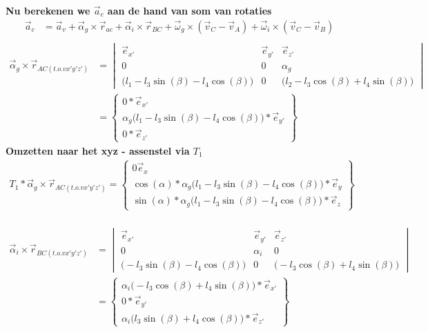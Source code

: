 \documentclass[a4paper,10pt]{article}
\begin{document}
\textbf{Nu berekenen we $\vec{a}_c$ aan de hand van som van rotaties} 
\begin{equation}
	\begin{aligned}
		\vec{a}_c &= \vec{a}_v + \vec{\alpha}_g  \times \vec{r}_{ac} + \vec{\alpha}_i \times \vec{r}_{BC} + \vec{\omega}_g \times ( \vec{v}_{C} - \vec{v}_{A}) + \vec{\omega}_i \times ( \vec{v}_{C} - \vec{v}_{B})\\
	\end{aligned}
\end{equation}
\begin{equation}
	\begin{aligned}
		\vec{\alpha}_g \times \vec{r}_{AC(t.o.v x'y'z')}  &=  \begin{vmatrix}
			\vec{e}_{x'}& \vec{e}_{y'} & \vec{e}_{z'}\\
			0 & 0 & \alpha_g \\		
			\Big(l_1 - l_3 \sin(\beta) - l_4 \cos(\beta)\Big) &
			0 & \Big (l_2 - l_3 \cos(\beta) + l_4 \sin(\beta) \Big) 
		\end{vmatrix}\\
		&= \begin{Bmatrix}
			0*\vec{e}_{x'}\\
			\alpha_g \Big(l_1 - l_3 \sin(\beta) - l_4 \cos(\beta)\Big)*\vec{e}_{y'}\\
			0*\vec{e}_{z'}
		\end{Bmatrix}
	\end{aligned}
\end{equation}
\textbf{Omzetten naar het xyz - assenstel via $T_1$}
\begin{equation}
	\begin{aligned}
		{T}_{1}*\vec{\alpha}_g \times \vec{r}_{AC(t.o.v x'y'z')} = \begin{Bmatrix}
			{0\vec{e}_{x}}\\
			\cos(\alpha)*	\alpha_g \Big(l_1 - l_3 \sin(\beta) - l_4 \cos(\beta)\Big)*\vec{e}_{y}\\
			\sin(\alpha)*	\alpha_g \Big(l_1 - l_3 \sin(\beta) - l_4 \cos(\beta)\Big)*\vec{e}_{z}
		\end{Bmatrix}
	\end{aligned}
\end{equation}\\
\begin{equation}
	\begin{aligned}
		\vec{\alpha}_i \times \vec{r}_{BC(t.o.v x'y'z')}  &=  \begin{vmatrix}
			\vec{e}_{x'}& \vec{e}_{y'} & \vec{e}_{z'}\\
			0 & \alpha_i & 0 \\		
			\Big(- l_3 \sin(\beta) - l_4 \cos(\beta)\Big) &
			0 & \Big (- l_3 \cos(\beta) + l_4 \sin(\beta) \Big) 
		\end{vmatrix}\\
		&= \begin{Bmatrix}
			\alpha_i \Big(- l_3 \cos(\beta) + l_4 \sin(\beta)\Big)*\vec{e}_{x'}\\
			0*\vec{e}_{y'}\\
			\alpha_i \Big(l_3 \sin(\beta) + l_4 \cos(\beta)\Big)*\vec{e}_{z'}
		\end{Bmatrix}
	\end{aligned}
\end{equation}
\end{document}
